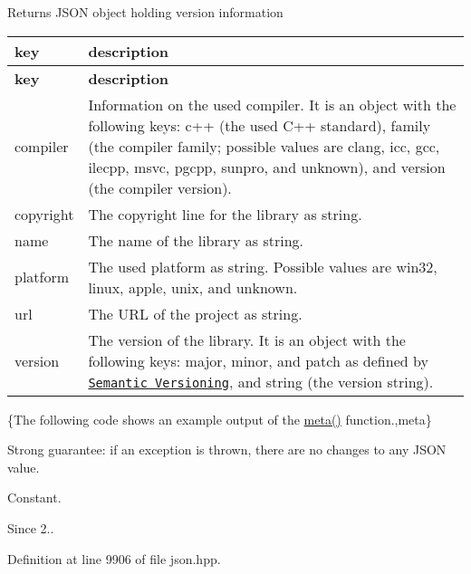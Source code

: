 \begin{DoxyReturn}{Returns}
J\+S\+ON object holding version information \tabulinesep=1mm
\begin{longtabu} spread 0pt [c]{*{2}{|X[-1]}|}
\hline
\rowcolor{\tableheadbgcolor}\textbf{ key }&\textbf{ description  }\\
\endfirsthead
\hline
\endfoot
\hline
\rowcolor{\tableheadbgcolor}\textbf{ key }&\textbf{ description  }\\
\endhead
{\ttfamily compiler} &Information on the used compiler. It is an object with the following keys\+: {\ttfamily c++} (the used C++ standard), {\ttfamily family} (the compiler family; possible values are {\ttfamily clang}, {\ttfamily icc}, {\ttfamily gcc}, {\ttfamily ilecpp}, {\ttfamily msvc}, {\ttfamily pgcpp}, {\ttfamily sunpro}, and {\ttfamily unknown}), and {\ttfamily version} (the compiler version). \\
{\ttfamily copyright} &The copyright line for the library as string. \\
{\ttfamily name} &The name of the library as string. \\
{\ttfamily platform} &The used platform as string. Possible values are {\ttfamily win32}, {\ttfamily linux}, {\ttfamily apple}, {\ttfamily unix}, and {\ttfamily unknown}. \\
{\ttfamily url} &The U\+RL of the project as string. \\
{\ttfamily version} &The version of the library. It is an object with the following keys\+: {\ttfamily major}, {\ttfamily minor}, and {\ttfamily patch} as defined by \href{http://semver.org}{\tt Semantic Versioning}, and {\ttfamily string} (the version string). \\
\end{longtabu}
\{The following code shows an example output of the {\ttfamily \hyperlink{classnlohmann_1_1basic__json_aef6d0eeccee7c5c7e1317c2ea1607fab}{meta()}} function.,meta\}
\end{DoxyReturn}
Strong guarantee\+: if an exception is thrown, there are no changes to any J\+S\+ON value.

Constant.

\begin{DoxySince}{Since}
2.. 
\end{DoxySince}


Definition at line 9906 of file json.\+hpp.



